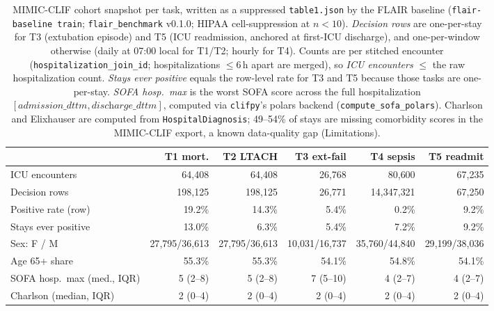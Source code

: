 \begin{table}[h]
\centering
\footnotesize
\setlength{\tabcolsep}{3pt}
\begin{tabular}{lrrrrr}
\toprule
                            & \textbf{T1 mort.} & \textbf{T2 LTACH} & \textbf{T3 ext-fail} & \textbf{T4 sepsis} & \textbf{T5 readmit} \\
\midrule
ICU encounters              & 64{,}408          & 64{,}408          & 26{,}768           & 80{,}600         & 67{,}235        \\
Decision rows               & 198{,}125         & 198{,}125         & 26{,}771           & 14{,}347{,}321  & 67{,}250        \\
Positive rate (row)         & 19.2\%            & 14.3\%            & 5.4\%              & 0.2\%            & 9.2\%           \\
Stays ever positive         & 13.0\%            & 6.3\%             & 5.4\%              & 7.2\%            & 9.2\%           \\
\midrule
Sex: F / M                  & 27{,}795/36{,}613 & 27{,}795/36{,}613 & 10{,}031/16{,}737  & 35{,}760/44{,}840 & 29{,}199/38{,}036 \\
Age 65+ share               & 55.3\%            & 55.3\%            & 54.1\%             & 54.8\%           & 54.1\%          \\
SOFA hosp.\ max (med., IQR) & 5 (2--8)          & 5 (2--8)          & 7 (5--10)          & 4 (2--7)         & 4 (2--7)        \\
Charlson (median, IQR)      & 2 (0--4)          & 2 (0--4)          & 2 (0--4)           & 2 (0--4)         & 2 (0--4)        \\
\bottomrule
\end{tabular}
\caption{MIMIC-CLIF cohort snapshot per task, written as a suppressed
\texttt{table1.json} by the FLAIR baseline (\texttt{flair-baseline
train}; \texttt{flair\_benchmark} v0.1.0; HIPAA cell-suppression at
$n{<}10$).
\emph{Decision rows} are one-per-stay for T3 (extubation episode) and
T5 (ICU readmission, anchored at first-ICU discharge), and
one-per-window otherwise (daily at 07:00 local for T1/T2; hourly for
T4). Counts are per stitched encounter
(\texttt{hospitalization\_join\_id}; hospitalizations $\le$6\,h apart are
merged), so \emph{ICU encounters} $\le$ the raw hospitalization count.
\emph{Stays ever positive} equals the row-level rate for T3 and T5
because those tasks are one-per-stay. \emph{SOFA hosp.\ max} is the worst
SOFA score across the full hospitalization
$[\textit{admission\_dttm}, \textit{discharge\_dttm}]$, computed via
\texttt{clifpy}'s polars backend (\texttt{compute\_sofa\_polars}).
Charlson and Elixhauser are computed from
\texttt{HospitalDiagnosis}; 49--54\% of stays are missing comorbidity
scores in the MIMIC-CLIF export, a known data-quality gap (Limitations).}
\label{tab:mimic-snapshot}
\end{table}

